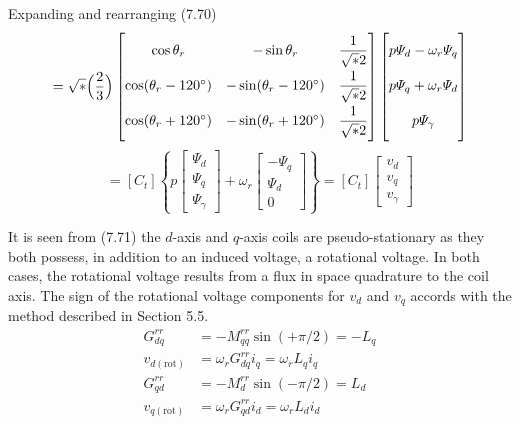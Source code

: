 \documentclass[a4paper,numbers=noenddot,12pt]{scrbook}
\begin{document}
    Expanding and rearranging (7.70)
    \begin{equation*}
        [v_{abc}] = \sqrt*{\Big( \dfrac{2}{3} \Big)}
        \begin{bmatrix}
            \cos \theta_r & -\sin \theta_r & \dfrac{1}{\sqrt*{2}} \\[2ex]
            \cos (\theta_r - 120^{\circ}) & -\sin (\theta_r - 120^{\circ}) & \dfrac{1}{\sqrt*{2}} \\[2ex]
            \cos (\theta_r + 120^{\circ}) & -\sin (\theta_r + 120^{\circ}) & \dfrac{1}{\sqrt*{2}}
        \end{bmatrix}
        \begin{bmatrix}
            p \varPsi_d - \omega_r \varPsi_q \vphantom{\dfrac{1}{\sqrt*{2}}} \\[2ex]
            p \varPsi_q + \omega_r \varPsi_d\vphantom{\dfrac{1}{\sqrt*{2}}} \\[2ex]
            p \varPsi_{\gamma} \vphantom{\dfrac{1}{\sqrt*{2}}}
        \end{bmatrix}
    \end{equation*}
    \begin{equation}
        [v_{abc}] = [C_t] 
        \left\{ p
            \begin{bmatrix}
                \varPsi_d \\ \varPsi_q \\ \varPsi_{\gamma}
            \end{bmatrix}
            +
            \omega_r
            \begin{bmatrix}
                - \varPsi_q \\ \varPsi_d \\ 0 
            \end{bmatrix}
        \right\} 
        = [C_t]
        \begin{bmatrix}
            v_d \\ v_q \\v_{\gamma}
        \end{bmatrix}
        \label{eq:Eq7.71}
    \end{equation}

    It is seen from (7.71) the $d$-axis and $q$-axis coils are pseudo-stationary as they both possess, in addition to an induced voltage, a rotational voltage. In both cases, the rotational voltage results from a flux in space quadrature to the coil axis. The sign of the rotational voltage components for $v_d$ and $v_q$ accords with the method described in Section 5.5.
    \begin{align*}
        G_{dq}^{rr} & = - M_{qq}^{rr} \sin (+ \pi/2) = -L_q \\
        v_{d(\text{rot})} & = \omega_r G_{dq}^{rr} i_q = \omega_r L_q i_q\\
        G_{qd}^{rr} & = - M_{d}^{rr} \sin (- \pi/2) = L_d \\
        v_{q(\text{rot})} & = \omega_r G_{qd}^{rr} i_d = \omega_r L_d i_d\\
    \end{align*}
\end{document}
